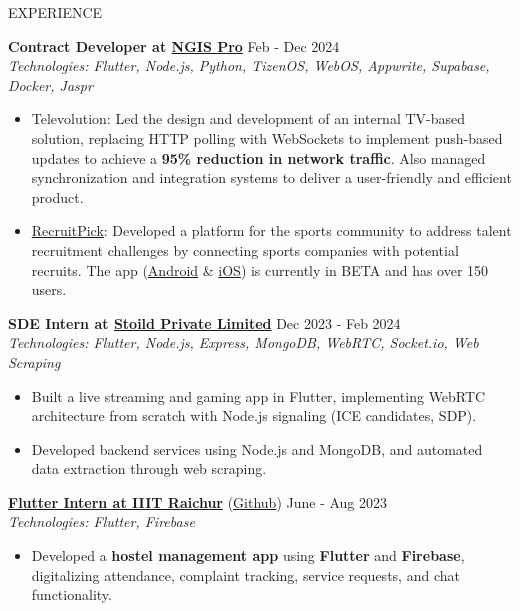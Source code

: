 \documentclass{resume} %
\begin{document}
\begin{rSection}{EXPERIENCE}

\textbf{Contract Developer at \href{https://ngispro.com}{NGIS Pro}} \hfill Feb - Dec 2024\\
\textit{Technologies: Flutter, Node.js, Python, TizenOS, WebOS, Appwrite, Supabase, Docker, Jaspr}
 \begin{itemize}
    \itemsep -3pt {}
    \item Televolution: Led the design and development of an internal TV-based solution, replacing HTTP polling with
    WebSockets to implement push-based updates to achieve a \textbf{95\% reduction in network traffic}. Also managed
    synchronization and integration systems to deliver a user-friendly and efficient product.
    \item \href{https://recruitpick.com}{RecruitPick}: Developed a platform for the sports community to address talent recruitment challenges by connecting sports companies with potential recruits. The app (\href{https://play.google.com/store/apps/details?id=com.recruitpick.app.prod}{Android} \& \href{https://apps.apple.com/in/app/recruit-pick-inc/id6478814537}{iOS}) is currently in BETA and has over 150 users.
 \end{itemize}
 
\textbf{SDE Intern at \href{https://stoild.in/}{Stoild Private Limited}} \hfill Dec 2023 - Feb 2024\\
\textit{Technologies: Flutter, Node.js, Express, MongoDB, WebRTC, Socket.io, Web Scraping}
 \begin{itemize}
    \itemsep -3pt {}
     \item Built a live streaming and gaming app in Flutter, implementing WebRTC architecture from scratch with Node.js signaling (ICE candidates, SDP).
     \item Developed backend services using Node.js and MongoDB, and automated data extraction through web scraping.
 \end{itemize}

\textbf{\href{https://drive.google.com/file/d/16NqRxg5LFhZu0WkdqG3z83XnLyf5P2UO/view?usp=sharing}{Flutter Intern at IIIT Raichur}} (\href{https://github.com/ShivanshuKGupta/hustle_stay}{Github}) \hfill June - Aug 2023\\
\textit{Technologies: Flutter, Firebase}
 \begin{itemize}
    \itemsep -3pt {} 
    \item Developed a \textbf{hostel management app} using \textbf{Flutter} and \textbf{Firebase}, digitalizing attendance, complaint tracking, service requests, and chat functionality.
 \end{itemize}
\end{rSection}
\end{document}
